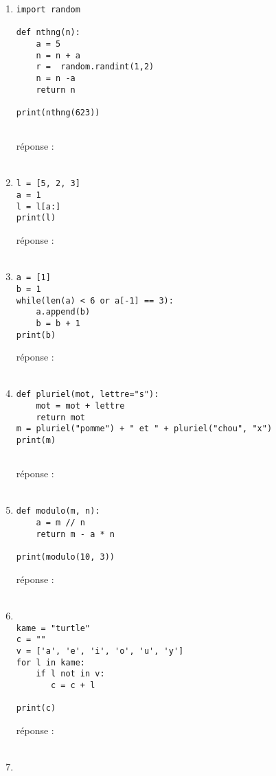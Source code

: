 \documentclass[12pt,a4paper]{article}
\newcommand{\response}{réponse : \hrulefill\\\\}
\begin{document}
\begin{enumerate}
\begin{lstlisting}
l = [1, 2]
l = wtf(l)
l = wtf(l)
print(l)
\end{lstlisting}
\response %

\pagebreak

\item
\begin{lstlisting}
import random

def nthng(n):
	a = 5
	n = n + a
	r =  random.randint(1,2)
	n = n -a
	return n
	
print(nthng(623))
	
\end{lstlisting}
\response %


\item
\begin{lstlisting}
l = [5, 2, 3]
a = 1
l = l[a:]
print(l)
\end{lstlisting}
\response %

\item
\begin{lstlisting}
a = [1]
b = 1
while(len(a) < 6 or a[-1] == 3):
	a.append(b)
	b = b + 1
print(b)

\end{lstlisting}
\response %

\item
\begin{lstlisting}
def pluriel(mot, lettre="s"):
	mot = mot + lettre
	return mot
m = pluriel("pomme") + " et " + pluriel("chou", "x")
print(m)
	
\end{lstlisting}
\response %

\item
\begin{lstlisting}
def modulo(m, n):
	a = m // n
	return m - a * n
	
print(modulo(10, 3))
\end{lstlisting}
\response %

\item

\begin{lstlisting}

kame = "turtle"
c = ""
v = ['a', 'e', 'i', 'o', 'u', 'y']
for l in kame:
	if l not in v:
	   c = c + l

print(c)
\end{lstlisting}
\response %

\pagebreak

\item
\begin{lstlisting}


\end{lstlisting}
\end{enumerate}
\end{document}
